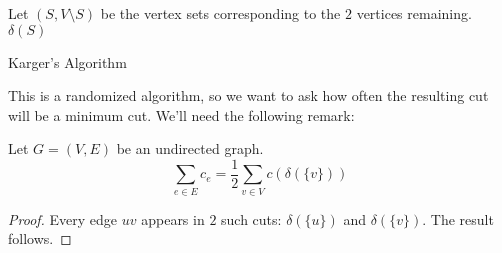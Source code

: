 \IncMargin{1em}
\begin{algorithm}[H]\label{alg:karger}  
    \nl {}

    \nl Let $(S, V\setminus S)$ be the vertex sets corresponding to the $2$ vertices remaining. \Return $\delta(S)$ 

    \caption{Karger's Algorithm}
\end{algorithm}

This is a randomized algorithm, so we want to ask how often the resulting cut will be a minimum cut. We'll need the following remark:
\begin{remark}{}{}
    Let $G = (V, E)$ be an undirected graph.
    \begin{equation*}
        \sum_{e \in E} c_e = \frac{1}{2}\sum_{v \in V} c(\delta(\{v\}))
    \end{equation*} 
\end{remark}
\begin{proof}
    Every edge $uv$ appears in $2$ such cuts: $\delta(\{u\})$ and $\delta(\{v\})$. The result follows.
\end{proof}

